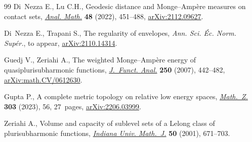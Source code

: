 \documentclass[11pt]{article}
\numberwithin{equation}{section}
\numberwithin{equation}{section}
\theoremstyle{plain}
\begin{document}
\begin{thebibliography}{99}
Di~Nezza E., Lu C.H., Geodesic distance and {M}onge--{A}mp\`ere measures on
 contact sets, \href{https://doi.org/10.1007/s10476-022-0159-1}{\textit{Anal. Math.}} \textbf{48} (2022), 451--488,
 \href{https://arxiv.org/abs/2112.09627}{arXiv:2112.09627}.

Di~Nezza E., Trapani S., The regularity of envelopes, \textit{Ann. Sci. \'Ec.
 Norm. Sup\'er.}, {t}o appear, \href{https://arxiv.org/abs/2110.14314}{arXiv:2110.14314}.

Guedj V., Zeriahi A., The weighted {M}onge--{A}mp\`ere energy of
 quasiplurisubharmonic functions, \href{https://doi.org/10.1016/j.jfa.2007.04.018}{\textit{J.~Funct. Anal.}} \textbf{250}
 (2007), 442--482, \href{https://arxiv.org/abs/math.CV/0612630}{arXiv:math.CV/0612630}.

Gupta P., A complete metric topology on relative low energy spaces,
 \href{https://doi.org/10.1007/s00209-023-03218-5}{\textit{Math.~Z.}} \textbf{303} (2023), 56, 27~pages, \href{https://arxiv.org/abs/2206.03999}{arXiv:2206.03999}.

Zeriahi A., Volume and capacity of sublevel sets of a {L}elong class of
 plurisubharmonic functions, \href{https://doi.org/10.1512/iumj.2001.50.2062}{\textit{Indiana Univ. Math.~J.}} \textbf{50}
 (2001), 671--703.

\end{thebibliography}
\end{document}
